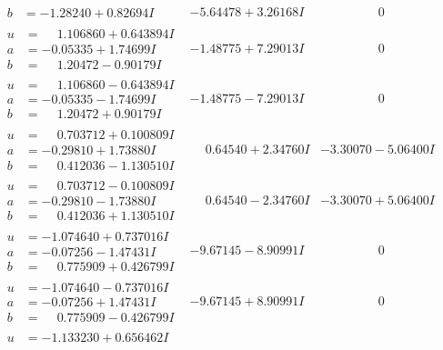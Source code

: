 \documentclass[1p]{elsarticle_modified}
\theoremstyle{definition}
\begin{document}
$$\begin{array}{c|c|c}
\begin{aligned}
b &= -1.28240 + 0.82694 I\end{aligned}
 & -5.64478 + 3.26168 I & \phantom{-0.000000 } 0 \\ \hline\begin{aligned}
u &= \phantom{-}1.106860 + 0.643894 I \\
a &= -0.05335 + 1.74699 I \\
b &= \phantom{-}1.20472 - 0.90179 I\end{aligned}
 & -1.48775 + 7.29013 I & \phantom{-0.000000 } 0 \\ \hline\begin{aligned}
u &= \phantom{-}1.106860 - 0.643894 I \\
a &= -0.05335 - 1.74699 I \\
b &= \phantom{-}1.20472 + 0.90179 I\end{aligned}
 & -1.48775 - 7.29013 I & \phantom{-0.000000 } 0 \\ \hline\begin{aligned}
u &= \phantom{-}0.703712 + 0.100809 I \\
a &= -0.29810 + 1.73880 I \\
b &= \phantom{-}0.412036 - 1.130510 I\end{aligned}
 & \phantom{-}0.64540 + 2.34760 I & -3.30070 - 5.06400 I \\ \hline\begin{aligned}
u &= \phantom{-}0.703712 - 0.100809 I \\
a &= -0.29810 - 1.73880 I \\
b &= \phantom{-}0.412036 + 1.130510 I\end{aligned}
 & \phantom{-}0.64540 - 2.34760 I & -3.30070 + 5.06400 I \\ \hline\begin{aligned}
u &= -1.074640 + 0.737016 I \\
a &= -0.07256 - 1.47431 I \\
b &= \phantom{-}0.775909 + 0.426799 I\end{aligned}
 & -9.67145 - 8.90991 I & \phantom{-0.000000 } 0 \\ \hline\begin{aligned}
u &= -1.074640 - 0.737016 I \\
a &= -0.07256 + 1.47431 I \\
b &= \phantom{-}0.775909 - 0.426799 I\end{aligned}
 & -9.67145 + 8.90991 I & \phantom{-0.000000 } 0 \\ \hline\begin{aligned}
u &= -1.133230 + 0.656462 I \\

\end{aligned}
\end{array}$$
\end{document}
